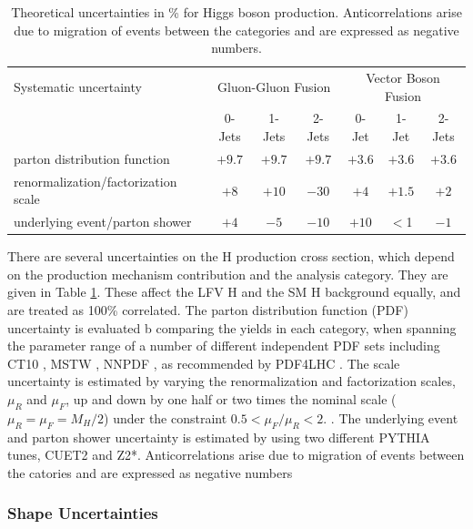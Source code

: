 \documentclass[oneside, letterpaper, oldfontcommands]{memoir}
\begin{document}
\begin{table}[hbtp]
 \centering
  \caption{Theoretical uncertainties in \% for Higgs boson production. Anticorrelations arise due to  migration of events between the categories and are expressed as negative numbers. }
  \label{tab:theory_systematics}
  \begin{tabular}{lccc|ccc} \hline
Systematic uncertainty                  &  \multicolumn{3}{c|}{Gluon-Gluon Fusion} &  \multicolumn{3}{c}{Vector Boson Fusion}  \\ \cline{2-7}
                                &    0-Jets  & 1-Jets  & 2-Jets   & 0-Jet & 1-Jet  & 2-Jets  \\ \hline
parton distribution function         &    $+9.7$  &  $+9.7$ &   $+9.7$ & $+3.6$  &   $+3.6$  &  $+3.6$  \\
renormalization/factorization scale           &    $+8$    &  $+10$   &  $-30$   & $+4$     &   $+1.5$  & $+2$   \\
underlying event/parton shower  &   $+4$     & $-5$   &  $-10$   & $+10$    &   $<$1    & $-1$   \\ \hline
  \end{tabular}

\end{table}


\qquad There are several uncertainties on the H production cross section, which depend on the production mechanism contribution and the analysis category. They are given in Table \ref{tab:theory_systematics}. These affect the LFV H and the SM H background equally, and are treated as 100\% correlated. The parton distribution function (PDF) uncertainty is evaluated b comparing the yields in each category, when spanning the parameter range of a number of different independent PDF sets including CT10 \cite{Nadolsky:2008zw}, MSTW \cite{Martin:2009iq}, NNPDF \cite{Ball:2010de}, as recommended by PDF4LHC \cite{Alekhin:2011sk}. The scale uncertainty is estimated by varying the renormalization and factorization scales, $\mu_{R}$ and $\mu_{F}$, up and down by one half or two times the nominal scale ($\mu_{R} = \mu_{F} = M_{H}/2$) under the constraint $0.5 < \mu_{F}/\mu_{R} < 2$. \cite{Dittmaier:2011ti}. The underlying event and parton shower uncertainty is estimated by using two different PYTHIA tunes, CUET2 and Z2*. Anticorrelations arise due to migration of events between the catories and are expressed as negative numbers
 
\subsubsection{Shape Uncertainties}
\end{document}
